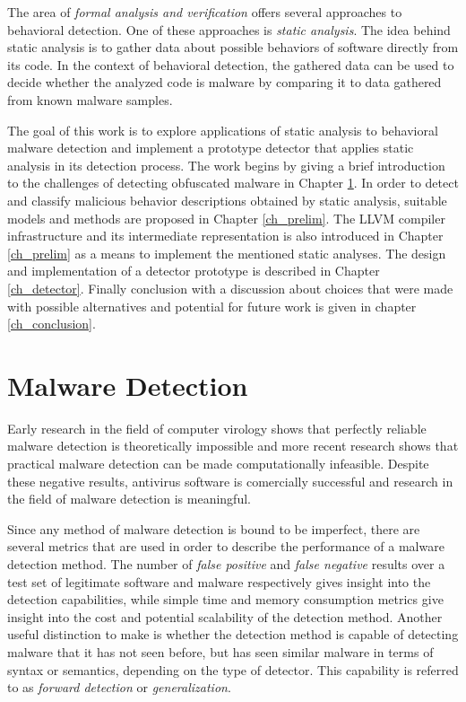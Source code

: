 The area of \emph{formal analysis and verification} offers several approaches to behavioral detection. One of these approaches is \emph{static analysis}. The idea behind static analysis is to gather data about possible behaviors of software directly from its code. In the context of behavioral detection, the gathered data can be used to decide whether the analyzed code is malware by comparing it to data gathered from known malware samples.

The goal of this work is to explore applications of static analysis to behavioral malware detection and implement a prototype detector that applies static analysis in its detection process. The work begins by giving a brief introduction to the challenges of detecting obfuscated malware in Chapter \ref{ch_malware}. In order to detect and classify malicious behavior descriptions obtained by static analysis, suitable models and methods are proposed in Chapter \ref{ch_prelim}. The \textsc{LLVM} compiler infrastructure and its intermediate representation is also introduced in Chapter \ref{ch_prelim} as a means to implement the mentioned static analyses. The design and implementation of a detector prototype is described in Chapter \ref{ch_detector}. Finally conclusion with a discussion about choices that were made with possible alternatives and potential for future work is given in chapter \ref{ch_conclusion}.

\chapter{Malware Detection}
\label{ch_malware}
Early research in the field of computer virology shows that perfectly reliable malware detection is theoretically impossible\cite{Cohen86} and more recent research shows that practical malware detection can be made computationally infeasible\cite{Filiol12}. Despite these negative results, antivirus software is comercially successful and research in the field of malware detection is meaningful.

Since any method of malware detection is bound to be imperfect, there are several metrics that are used in order to describe the performance of a malware detection method. The number of \emph{false positive} and \emph{false negative} results over a test set of legitimate software and malware respectively gives insight into the detection capabilities, while simple time and memory consumption metrics give insight into the cost and potential scalability of the detection method. Another useful distinction to make is whether the detection method is capable of detecting malware that it has not seen before, but has seen similar malware in terms of syntax or semantics, depending on the type of detector. This capability is referred to as \emph{forward detection}\cite{Christo07} or \emph{generalization}\cite{Babic11}.

